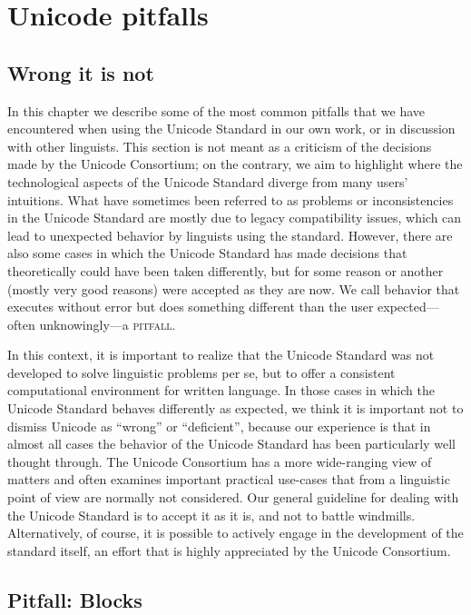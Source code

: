 \chapter{Unicode pitfalls}
\label{unicode-pitfalls}

\section{Wrong it is not}
\label{wrong-it-is-not}

In this chapter we describe some of the most common pitfalls that we have
encountered when using the Unicode Standard in our own work, or in discussion
with other linguists. This section is not meant as a criticism of the decisions
made by the Unicode Consortium; on the contrary, we aim to highlight where the
technological aspects of the Unicode Standard diverge from many users'
intuitions. What have sometimes been referred to as problems or inconsistencies
in the Unicode Standard are mostly due to legacy compatibility issues, which can
lead to unexpected behavior by linguists using the standard. However, there are
also some cases in which the Unicode Standard has made decisions that
theoretically could have been taken differently, but for some reason or another
(mostly very good reasons) were accepted as they are now. We call behavior that
executes without error but does something different than the user
expected---often unknowingly---a \textsc{pitfall}.

In this context, it is important to realize that the Unicode Standard was not
developed to solve linguistic problems per se, but to offer a consistent
computational environment for written language. In those cases in which the
Unicode Standard behaves differently as expected, we think it is important not
to dismiss Unicode as ``wrong'' or ``deficient'', because our
experience is that in almost all cases the behavior of the Unicode Standard has
been particularly well thought through. The Unicode Consortium has a more
wide-ranging view of matters and often examines important practical use-cases
that from a linguistic point of view are normally not considered. Our general
guideline for dealing with the Unicode Standard is to accept it as it is, and
not to battle windmills. Alternatively, of course, it is possible to actively
engage in the development of the standard itself, an effort that is highly
appreciated by the Unicode Consortium.

\section{Pitfall: Blocks}
\label{pitfall-blocks}

